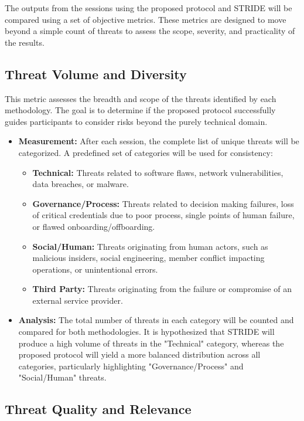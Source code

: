 The outputs from the sessions using the proposed protocol and STRIDE will be
compared using a set of objective metrics. These metrics are designed to move
beyond a simple count of threats to assess the scope, severity, and practicality
of the results.

\subsection{Threat Volume and Diversity}
\label{subsec:threat_volume_and_diversity}

This metric assesses the breadth and scope of the threats identified by each
methodology. The goal is to determine if the proposed protocol successfully
guides participants to consider risks beyond the purely technical domain.

\begin{itemize}
\item \textbf{Measurement:} After each session, the complete list of unique
threats will be categorized. A predefined set of categories will be used for
consistency:
\begin{itemize}
\item \textbf{Technical:} Threats related to software flaws, network
vulnerabilities, data breaches, or malware.
\item \textbf{Governance/Process:} Threats related to decision making failures,
loss of critical credentials due to poor process, single points of human
failure, or flawed onboarding/offboarding.
\item \textbf{Social/Human:} Threats originating from human actors, such as
malicious insiders, social engineering, member conflict impacting operations, or
unintentional errors.
\item \textbf{Third Party:} Threats originating from the failure or compromise
of an external service provider.
\end{itemize}
\item \textbf{Analysis:} The total number of threats in each category will be
counted and compared for both methodologies. It is hypothesized that STRIDE will
produce a high volume of threats in the "Technical" category, whereas the
proposed protocol will yield a more balanced distribution across all categories,
particularly highlighting "Governance/Process" and "Social/Human" threats.
\end{itemize}

\subsection{Threat Quality and Relevance}
\label{subsec:threat_quality_and_relevance}

